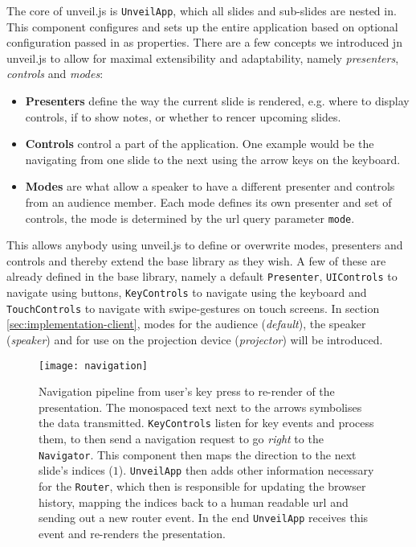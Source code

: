 The core of unveil.js is \texttt{UnveilApp}, which all slides and sub-slides are nested in. This component configures and sets up the entire application based on optional configuration passed in as properties. There are a few concepts we introduced jn unveil.js to allow for maximal extensibility and adaptability, namely \emph{presenters}, \emph{controls} and \emph{modes}:
%
\begin{itemize}
\item \textbf{Presenters} define the way the current slide is rendered, e.g. where to display controls, if to show notes, or whether to rencer upcoming slides.
\item \textbf{Controls} control a part of the application. One example would be the navigating from one slide to the next using the arrow keys on the keyboard.
\item \textbf{Modes} are what allow a speaker to have a different presenter and controls from an audience member. Each mode defines its own presenter and set of controls, the mode is determined by the url query parameter \texttt{mode}.
\end{itemize}
This allows anybody using unveil.js to define or overwrite modes, presenters and controls and thereby extend the base library as they wish. A few of these are already defined in the base library, namely a default \texttt{Presenter}, \texttt{UIControls} to navigate using buttons, \texttt{KeyControls} to navigate using the keyboard and \texttt{TouchControls} to navigate with swipe-gestures on touch screens. In section \ref{sec:implementation-client}, modes for the audience (\emph{default}), the speaker (\emph{speaker}) and for use on the projection device (\emph{projector}) will be introduced.

\begin{figure}
\centering
\texttt{[image: navigation]}
\caption{Navigation pipeline from user's key press to re-render of the presentation. The monospaced text next to the arrows symbolises the data transmitted. \texttt{KeyControls} listen for key events and process them, to then send a navigation request to go \emph{right} to the \texttt{Navigator}. This component then maps the direction to the next slide's indices ($1$). \texttt{UnveilApp} then adds other information necessary for the \texttt{Router}, which then is responsible for updating the browser history, mapping the indices back to a human readable url and sending out a new router event. In the end \texttt{UnveilApp} receives this event and re-renders the presentation.}
\label{fig:implementation-technologies-unveil-navigation}
\end{figure}

